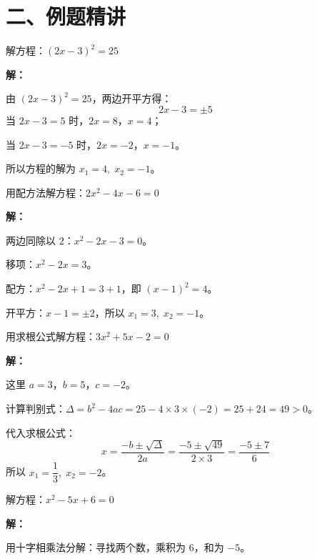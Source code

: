 \documentclass[12pt, a4paper]{ctexart}
\begin{document}
\section*{\textcolor{examorange}{二、例题精讲}}

\begin{examplebox}[【例1】用直接开平方法解方程]
解方程：$(2x-3)^2 = 25$
\end{examplebox}

\textbf{解：}

由 $(2x-3)^2 = 25$，两边开平方得：
\[
2x - 3 = \pm 5
\]
当 $2x-3 = 5$ 时，$2x = 8$，$x = 4$；

当 $2x-3 = -5$ 时，$2x = -2$，$x = -1$。

所以方程的解为 $\boxed{x_1 = 4,\; x_2 = -1}$。

\begin{examplebox}[【例2】用配方法解方程]
用配方法解方程：$2x^2 - 4x - 6 = 0$
\end{examplebox}

\textbf{解：}

两边同除以 $2$：$x^2 - 2x - 3 = 0$。

移项：$x^2 - 2x = 3$。

配方：$x^2 - 2x + 1 = 3 + 1$，即 $(x-1)^2 = 4$。

开平方：$x - 1 = \pm 2$，所以 $\boxed{x_1 = 3,\; x_2 = -1}$。

\begin{examplebox}[【例3】用公式法解方程]
用求根公式解方程：$3x^2 + 5x - 2 = 0$
\end{examplebox}

\textbf{解：}

这里 $a=3$，$b=5$，$c=-2$。

计算判别式：$\Delta = b^2 - 4ac = 25 - 4 \times 3 \times (-2) = 25 + 24 = 49 > 0$。

代入求根公式：
\[
x = \frac{-b \pm \sqrt{\Delta}}{2a} = \frac{-5 \pm \sqrt{49}}{2 \times 3} = \frac{-5 \pm 7}{6}
\]
所以 $\boxed{x_1 = \dfrac{1}{3},\; x_2 = -2}$。

\begin{examplebox}[【例4】用因式分解法解方程]
解方程：$x^2 - 5x + 6 = 0$
\end{examplebox}

\textbf{解：}

用十字相乘法分解：寻找两个数，乘积为 $6$，和为 $-5$。
\end{document}
